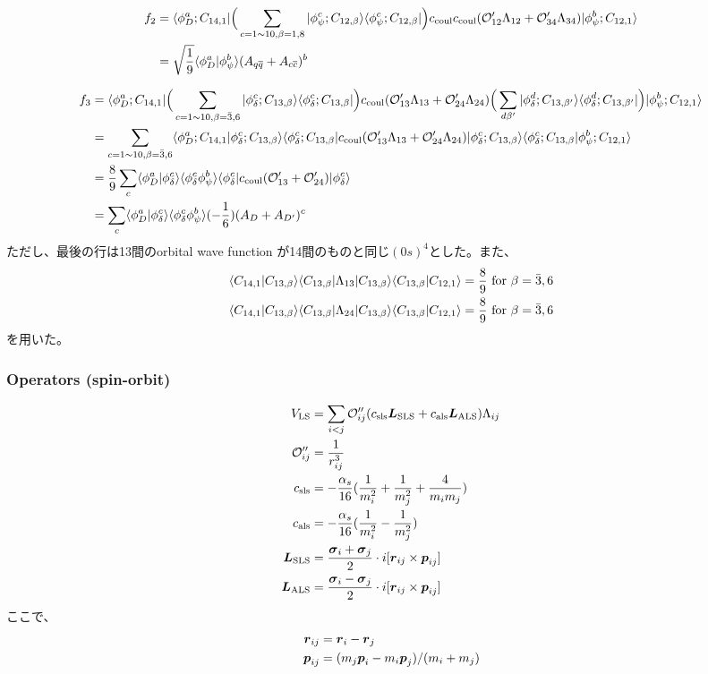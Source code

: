 \documentclass[a4j]{jarticle}
\def\bra{\langle}
\def\ket{\rangle}
\def\calO{{\cal O}}
\def\cbar{\overline{{c}}}
\def\qbar{\overline{{q}}}
\newcommand{\xbld}[1]{\mbox{\boldmath $#1$}}
\def\vecr{{\xbld{r}}}
\def\vecp{{\xbld{p}}}
\def\vecL{{\xbld{L}}}
\def\vecsig{{\xbld{\sigma}}}
\def\Vls{V_\text{LS}}
\def\Lsls{{\vecL_\text{SLS}}}
\def\Lals{{\vecL_\text{ALS}}}
\begin{document}
\begin{align}
f_2&=\bra \phi_D^a;C_{14,1}|
\Big(\sum_{c=1\sim 10,\beta=1,8}    |\phi_\psi^c;C_{12,\beta}\ket\bra\phi_\psi^c;C_{12,\beta}|\Big)
c_\text{coul}c_\text{coul}(\calO'_{12}\Lambda_{12}+\calO'_{34}\Lambda_{34})|\phi_\psi^b;C_{12,1}\ket
\\
&=\sqrt{1\over 9}\bra\phi_D^a|\phi_\psi^b\ket (A_{q\qbar}+A_{c\cbar})^b
\end{align}

\begin{align}
f_3&=\bra \phi_D^a;C_{14,1}|
\Big(\sum_{c=1\sim 10,\beta=\bar3,6}|\phi_\delta^c;C_{13,\beta}\ket\bra\phi_\delta^c;C_{13,\beta}|\Big)
c_\text{coul}(\calO'_{13}\Lambda_{13}+\calO'_{24}\Lambda_{24})
\Big(\sum_{d\beta'}|\phi_\delta^d;C_{13,\beta'}\ket\bra\phi_\delta^d;C_{13,\beta'}|\Big)
|\phi_\psi^b;C_{12,1}\ket
\\
&=
\sum_{c=1\sim 10,\beta=\bar3,6}
\bra \phi_D^a;C_{14,1}|\phi_\delta^c;C_{13,\beta}\ket\bra\phi_\delta^c;C_{13,\beta}|
c_\text{coul}(\calO'_{13}\Lambda_{13}+\calO'_{24}\Lambda_{24})
|\phi_\delta^c;C_{13,\beta}\ket\bra\phi_\delta^c;C_{13,\beta}
|\phi_\psi^b;C_{12,1}\ket
\\
&={8\over 9}\sum_c\bra\phi_D^a|\phi_\delta^c\ket\bra\phi_\delta^c\phi_\psi^b\ket 
\bra\phi_\delta^c|c_\text{coul}(\calO'_{13}+\calO'_{24})|\phi_\delta^c\ket
\\
&=\sum_c\bra\phi_D^a|\phi_\delta^c\ket\bra\phi_\delta^c\phi_\psi^b\ket 
(-{1\over 6})(A_D+A_{D'})^c
\end{align}
ただし、最後の行は13間のorbital wave function が14間のものと同じ$(0s)^4$とした。また、
\begin{align}
\bra C_{14,1}|C_{13,\beta}\ket\bra C_{13,\beta}|\Lambda_{13}|C_{13,\beta}\ket\bra C_{13,\beta}| C_{12,1}\ket
&={8\over 9}\text{    for }\beta=\bar3,6
\\
\bra C_{14,1}|C_{13,\beta}\ket\bra C_{13,\beta}|\Lambda_{24}|C_{13,\beta}\ket\bra C_{13,\beta}| C_{12,1}\ket
&={8\over 9}\text{    for }\beta=\bar3,6
\end{align}
を用いた。

\subsubsection{Operators (spin-orbit)}
\begin{align}
\Vls&=
\sum_{i<j}\calO''_{ij}(c_\text{sls}\Lsls +c_\text{als}\Lals)\Lambda_{ij}\\
\calO''_{ij}&={1\over  r_{ij}^3} 
\\
c_\text{sls}&=-{\alpha_s\over 16 }({1\over m_i^2}+{1\over m_j^2}+{4\over m_im_j})
\\
c_\text{als}&=-{\alpha_s\over 16 }({1\over m_i^2}-{1\over m_j^2})
\\
\Lsls&={\vecsig_i+\vecsig_j\over 2}\cdot i[\vecr_{ij}\times \vecp_{ij}]
\\
\Lals&={\vecsig_i-\vecsig_j\over 2}\cdot i[\vecr_{ij}\times \vecp_{ij}]
\end{align}
ここで、
\begin{align}
\vecr_{ij}&=\vecr_i-\vecr_j\\
\vecp_{ij}&=(m_j\vecp_i-m_i\vecp_j)/(m_i+m_j)
\end{align}
\end{document}
